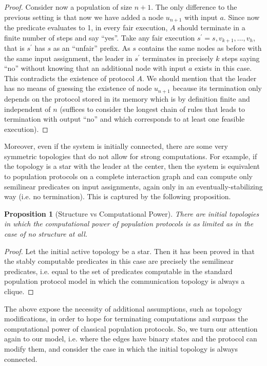 \documentclass[preprint]{elsarticle}
\newtheorem{proposition}{Proposition}
\begin{document}
\begin{proof}
Consider now a population of size $n+1$. The only difference to the previous setting is that now we have added a node $u_{n+1}$ with input $a$. Since now the predicate evaluates to 1, in every fair execution, $A$ should terminate in a finite number of steps and say ``yes''. Take any fair execution $s^\prime=s,v_{k+1},\ldots,v_h$, that is $s^\prime$ has $s$ as an ``unfair'' prefix. As $s$ contains the same nodes as before with the same input assignment, the leader in $s^\prime$ terminates in precisely $k$ steps saying ``no'' without knowing that an additional node with input $a$ exists in this case. This contradicts the existence of protocol $A$. We should mention that the leader has no means of guessing the existence of node $u_{n+1}$ because its termination only depends on the protocol stored in its memory which is by definition finite and independent of $n$ (suffices to consider the longest chain of rules that leads to termination with output ``no'' and which corresponds to at least one feasible execution).
\end{proof}

Moreover, even if the system is initially connected, there are some very symmetric topologies that do not allow for strong computations. For example, if the topology is a star with the leader at the center, then the system is equivalent to population protocols on a complete interaction graph and can compute only semilinear predicates on input assignments, again only in an eventually-stabilizing way (i.e. no termination). This is captured by the following proposition.

\begin{proposition} [Structure vs Computational Power]
There are initial topologies in which the computational power of population protocols is as limited as in the case of no structure at all.
\end{proposition}
\begin{proof}
Let the initial active topology be a star. Then it has been proved in \cite{CMNS13} that the stably computable predicates in this case are precisely the semilinear predicates, i.e. equal to the set of predicates computable in the standard population protocol model in which the communication topology is always a clique. 
\end{proof}

The above expose the necessity of additional assumptions, such as topology modifications, in order to hope for terminating computations and surpass the computational power of classical population protocols. So, we turn our attention again to our model, i.e. where the edges have binary states and the protocol can modify them, and consider the case in which the initial topology is always connected.
\end{document}
